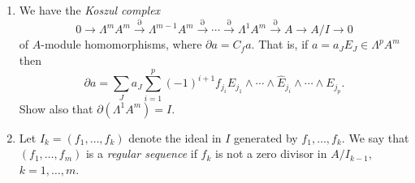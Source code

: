 \begin{enumerate}
\begin{enumerate}[label=\alph*)]
\item We have the \emph{Koszul complex}
\[
0\to\Lambda^m A^m\xrightarrow{\partial}\Lambda^{m-1}A^m\xrightarrow{\partial}\cdots\xrightarrow{\partial}\Lambda^1 A^m\xrightarrow{\partial} A\to A/I\to0
\]
of $A$-module homomorphisms, where $\partial a=C_fa$. That is, if $a=a_J E_J\in\Lambda^p A^m$ then
\[
\partial a=\sum_J a_J\sum_{i=1}^p(-1)^{i+1}f_{j_i}E_{j_1}\wedge\cdots\wedge\widehat{E}_{j_i}\wedge\cdots\wedge E_{j_p}.
\]
Show also that $\partial(\Lambda^1 A^m)=I$.
\item Let $I_k=(f_1,\ldots,f_k)$ denote the ideal in $I$ generated by $f_1,\ldots,f_k$. We say that $(f_1,\ldots,f_m)$ is a \emph{regular sequence} if $f_k$ is not a zero divisor in $A/I_{k-1}$, $k=1,\ldots,m$.


\end{enumerate}
\end{enumerate}
